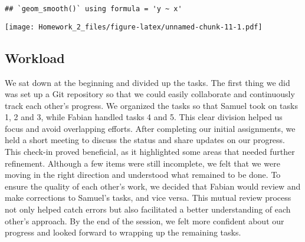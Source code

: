 \documentclass[
]{article}
\begin{document}
\begin{verbatim}
## `geom_smooth()` using formula = 'y ~ x'
\end{verbatim}

\texttt{[image: Homework\_2\_files/figure-latex/unnamed-chunk-11-1.pdf]}

\subsection{\texorpdfstring{\textbf{Workload}}{Workload}}\label{workload}

We sat down at the beginning and divided up the tasks. The first thing
we did was set up a Git repository so that we could easily collaborate
and continuously track each other's progress. We organized the tasks so
that Samuel took on tasks 1, 2 and 3, while Fabian handled tasks 4 and
5. This clear division helped us focus and avoid overlapping efforts.
After completing our initial assignments, we held a short meeting to
discuss the status and share updates on our progress. This check-in
proved beneficial, as it highlighted some areas that needed further
refinement. Although a few items were still incomplete, we felt that we
were moving in the right direction and understood what remained to be
done. To ensure the quality of each other's work, we decided that Fabian
would review and make corrections to Samuel's tasks, and vice versa.
This mutual review process not only helped catch errors but also
facilitated a better understanding of each other's approach. By the end
of the session, we felt more confident about our progress and looked
forward to wrapping up the remaining tasks.
\end{document}
